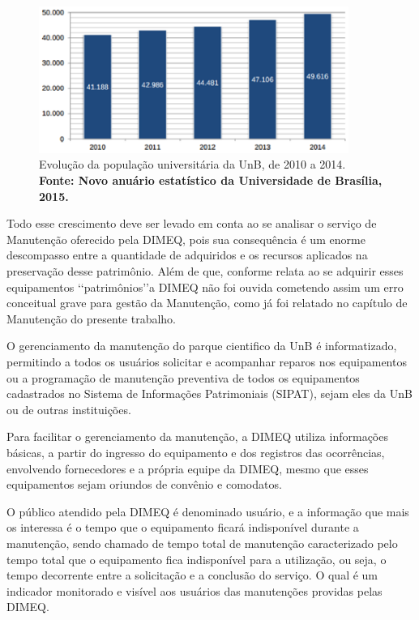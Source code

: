 \graphicspath{{figuras/}}
\begin{figure}[H]
\centering
\includegraphics[width=0.9\textwidth]{grafico_dimeq2.eps}
\caption{Evolução da população universitária da UnB, de 2010 a 2014. \textbf{Fonte: Novo anuário estatístico da Universidade de Brasília, 2015.}}
\label{grafico_dimeq2}
\end{figure}

Todo esse crescimento deve ser levado em conta ao se analisar o serviço de Manutenção oferecido pela DIMEQ, pois sua consequência é um enorme descompasso entre a quantidade de adquiridos e os recursos aplicados na preservação desse patrimônio. Além de que, conforme relata \cite{limacastilho2006} ao se adquirir esses equipamentos \lq\lq patrimônios\rq\rq a DIMEQ não foi ouvida cometendo assim um erro conceitual grave para gestão da Manutenção, como já foi relatado no capítulo de Manutenção do presente trabalho.
	
O gerenciamento da manutenção do parque cientifico da UnB é informatizado, permitindo a todos os usuários solicitar e acompanhar reparos nos equipamentos ou a programação de manutenção preventiva de todos os equipamentos cadastrados no Sistema de Informações Patrimoniais (SIPAT), sejam eles da UnB ou de outras instituições. 
	
Para facilitar o gerenciamento da manutenção, a DIMEQ utiliza informações básicas, a partir do ingresso do equipamento e dos registros das ocorrências, envolvendo fornecedores e a própria equipe da DIMEQ, mesmo que esses equipamentos sejam oriundos de convênio e comodatos.
	
O público atendido pela DIMEQ é denominado usuário, e a informação que mais os interessa é o tempo que o equipamento ficará indisponível durante a manutenção, sendo chamado de tempo total de manutenção caracterizado pelo tempo total que o equipamento fica indisponível para a utilização, ou seja, o tempo decorrente entre a solicitação e a conclusão do serviço. O qual é um indicador monitorado e visível aos usuários das manutenções providas pelas DIMEQ.

